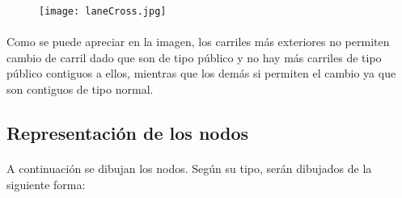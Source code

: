 	\begin{figure}[H]
		\centering
			\texttt{[image: laneCross.jpg]}
	\end{figure}
	
	\paragraph{}
	Como se puede apreciar en la imagen, los carriles más exteriores no permiten cambio de carril dado que son de tipo público y no hay más carriles de tipo público contiguos a ellos, mientras que los demás si permiten el cambio ya que son contiguos de tipo normal.
	
	\subsection{Representación de los nodos}
	\paragraph{}
	A continuación se dibujan los nodos. Según su tipo, serán dibujados de la siguiente forma:
	
